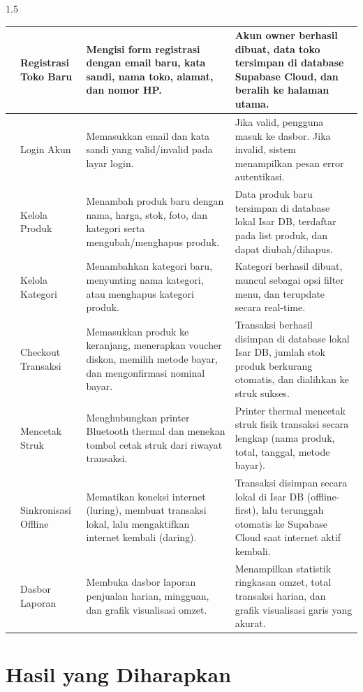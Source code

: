\documentclass[12pt, a4paper, onecolumn, oneside]{report}
\begin{document}
\begin{spacing}{1.5}
{\begin{longtable}{|>{\centering\arraybackslash}p{0.6cm}|>{\raggedright\arraybackslash}p{3.0cm}|>{\raggedright\arraybackslash}p{4.7cm}|>{\raggedright\arraybackslash}p{4.7cm}|}
1 & Registrasi Toko Baru & Mengisi form registrasi dengan email baru, kata sandi, nama toko, alamat, dan nomor HP. & Akun owner berhasil dibuat, data toko tersimpan di database Supabase Cloud, dan beralih ke halaman utama. \\
\hline
2 & Login Akun & Memasukkan email dan kata sandi yang valid/invalid pada layar login. & Jika valid, pengguna masuk ke dasbor. Jika invalid, sistem menampilkan pesan error autentikasi. \\
\hline
3 & Kelola Produk & Menambah produk baru dengan nama, harga, stok, foto, dan kategori serta mengubah/menghapus produk. & Data produk baru tersimpan di database lokal Isar DB, terdaftar pada list produk, dan dapat diubah/dihapus. \\
\hline
4 & Kelola Kategori & Menambahkan kategori baru, menyunting nama kategori, atau menghapus kategori produk. & Kategori berhasil dibuat, muncul sebagai opsi filter menu, dan terupdate secara real-time. \\
\hline
5 & Checkout Transaksi & Memasukkan produk ke keranjang, menerapkan voucher diskon, memilih metode bayar, dan mengonfirmasi nominal bayar. & Transaksi berhasil disimpan di database lokal Isar DB, jumlah stok produk berkurang otomatis, dan dialihkan ke struk sukses. \\
\hline
6 & Mencetak Struk & Menghubungkan printer Bluetooth thermal dan menekan tombol cetak struk dari riwayat transaksi. & Printer thermal mencetak struk fisik transaksi secara lengkap (nama produk, total, tanggal, metode bayar). \\
\hline
7 & Sinkronisasi Offline & Mematikan koneksi internet (luring), membuat transaksi lokal, lalu mengaktifkan internet kembali (daring). & Transaksi disimpan secara lokal di Isar DB (offline-first), lalu terunggah otomatis ke Supabase Cloud saat internet aktif kembali. \\
\hline
8 & Dasbor Laporan & Membuka dasbor laporan penjualan harian, mingguan, dan grafik visualisasi omzet. & Menampilkan statistik ringkasan omzet, total transaksi harian, dan grafik visualisasi garis yang akurat. \\
\hline
\end{longtable}
}

\section{Hasil yang Diharapkan}


\end{spacing}
\end{document}
